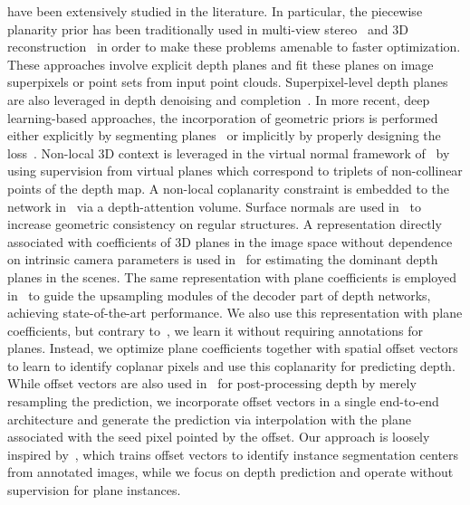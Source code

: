 \documentclass[final]{cvpr}
\newcommand{\PAR}[1]{\vskip2pt \noindent{\bf #1}}
\begin{document}
\PAR{Geometric priors for depth} have been extensively studied in the literature. In particular, the piecewise planarity prior has been traditionally used in multi-view stereo~\cite{piecewise:planar:and:nonplanar:stereo} and 3D reconstruction~\cite{robust:piecewise:planar:3d:reconstruction,fast:approximate:piecewise:planar:modeling} in order to make these problems amenable to faster optimization. These approaches involve explicit depth planes and fit these planes on image superpixels or point sets from input point clouds. Superpixel-level depth planes are also leveraged in depth denoising and completion~\cite{stereoscopic:inpainting,sfsu:synthetic}. In more recent, deep learning-based approaches, the incorporation of geometric priors is performed either explicitly by segmenting planes~\cite{structdepth,planenet:piecewise:planar:reconstruction,piecewise:planar:3d:reconstruction:associative:embedding,planercnn:3d:plane:detection:reconstruction} or implicitly by properly designing the loss~\cite{p2net:unsupervised:indoor:depth}. Non-local 3D context is leveraged in the virtual normal framework of~\cite{virtual:normal:depth} by using supervision from virtual planes which correspond to triplets of non-collinear points of the depth map. A non-local coplanarity constraint is embedded to the network in~\cite{depth:attention:volume} via a depth-attention volume. 
Surface normals are used in~\cite{adaptive:surface:normal:constraint:depth} to increase geometric consistency on regular structures. A representation directly associated with coefficients of 3D planes in the image space without dependence on intrinsic camera parameters is used in~\cite{geolayout, recovering:planes:eccv:2018} for estimating the dominant depth planes in the scenes. The same representation with plane coefficients is employed in~\cite{local:planar:guidance} to guide the upsampling modules of the decoder part of depth networks, achieving state-of-the-art performance. We also use this representation with plane coefficients, but contrary to~\cite{geolayout,recovering:planes:eccv:2018}, we learn it without requiring annotations for planes. Instead, we optimize plane coefficients together with spatial offset vectors to learn to identify coplanar pixels and use this coplanarity for predicting depth.
While offset vectors are also used in~\cite{occlusion:boundaries:using:displacement:fields} for post-processing depth by merely resampling the prediction, we incorporate offset vectors in a single end-to-end architecture and generate the prediction via interpolation with the plane associated with the seed pixel pointed by the offset. Our approach is loosely inspired by~\cite{instance:segmentation:spatial:embeddings}, which trains offset vectors to identify instance segmentation centers from annotated images, while we focus on depth prediction and operate without supervision for plane instances.
\end{document}

